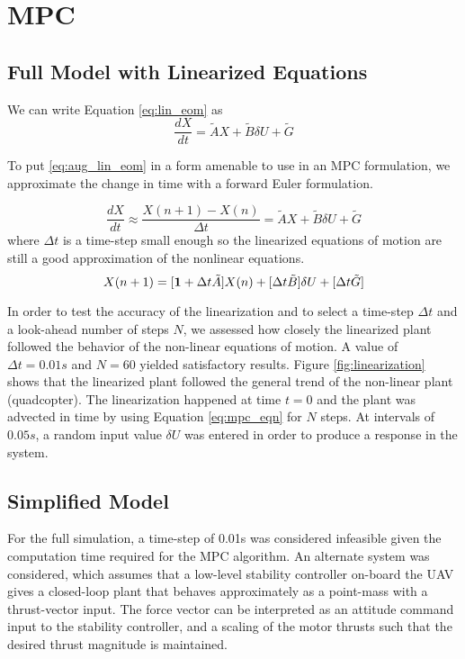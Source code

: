 \section{ MPC \label{sec:mpc}}
\subsection{Full Model with Linearized Equations} \label{sub:mpc_full}
We can write Equation \eqref{eq:lin_eom} as
\begin{equation} \label{eq:aug_lin_eom}
\frac{d X}{d t} = \tilde{A} X + \tilde{B} \delta U + \tilde{G}
\end{equation}

To put \eqref{eq:aug_lin_eom} in a form amenable to use in an MPC formulation, we approximate the change in time with a forward Euler formulation.

\begin{equation}
\frac{d X}{d t} \approx \frac{X(n+1) - X(n)}{\Delta t} = \tilde{A}X + \tilde{B}\delta U + \tilde{G}
\end{equation}
where $\Delta t$ is a time-step small enough so the linearized equations of motion are still a good approximation of the nonlinear equations.
\begin{equation} \label{eq:mpc_eqn}
 X(n+1) = [{\bf 1} + \Delta t \tilde{A}] X(n) +[\Delta t \tilde{B}]\delta U + [\Delta t\tilde{G}]
\end{equation}


In order to test the accuracy of the linearization and to select a time-step $\Delta t$ and a look-ahead number of steps $N$, we assessed how closely the linearized plant followed the behavior of the non-linear equations of motion. A value of $\Delta t = 0.01s$ and $N = 60$ yielded satisfactory results. Figure \eqref{fig:linearization} shows that the linearized plant followed the general trend of the non-linear plant (quadcopter). The linearization happened at time $t=0$ and the plant was advected in time by using Equation \eqref{eq:mpc_eqn} for $N$ steps. At intervals of $0.05s$, a random input value $\delta U$ was entered in order to produce a response in the system.

\subsection{Simplified Model} \label{sub:mpc_simple}
For the full simulation, a time-step of 0.01s was considered infeasible given the computation time required for the MPC algorithm.  An alternate system was considered, which assumes that a low-level stability controller on-board the UAV gives a closed-loop plant that behaves approximately as a point-mass with a thrust-vector input.  The force vector can be interpreted as an attitude command input to the stability controller, and a scaling of the motor thrusts such that the desired thrust magnitude is maintained.

